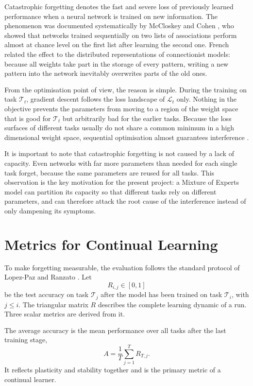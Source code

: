 Catastrophic forgetting denotes the fast and severe loss of previously
learned performance when a neural network is trained on new information.
The phenomenon was documented systematically by McCloskey and Cohen
\cite{mccloskey1989}, who showed that networks trained sequentially on two
lists of associations perform almost at chance level on the first list
after learning the second one. French \cite{french1999} related the effect
to the distributed representations of connectionist models: because all
weights take part in the storage of every pattern, writing a new pattern
into the network inevitably overwrites parts of the old ones.

From the optimisation point of view, the reason is simple. During the
training on task $\mathcal{T}_t$, gradient descent follows the loss
landscape of $\mathcal{L}_t$ only. Nothing in the objective prevents the
parameters from moving to a region of the weight space that is good for
$\mathcal{T}_t$ but arbitrarily bad for the earlier tasks. Because the loss
surfaces of different tasks usually do not share a common minimum in a high
dimensional weight space, sequential optimisation almost guarantees
interference \cite{goodfellow2013}.

It is important to note that catastrophic forgetting is not caused by a
lack of capacity. Even networks with far more parameters than needed for
each single task forget, because the same parameters are reused for all
tasks. This observation is the key motivation for the present project: a
Mixture of Experts model can partition its capacity so that different tasks
rely on different parameters, and can therefore attack the root cause of
the interference instead of only dampening its symptoms.

\section{Metrics for Continual Learning}
\label{sec:clmetrics}

To make forgetting measurable, the evaluation follows the standard protocol
of Lopez-Paz and Ranzato \cite{lopezpaz2017}. Let
\begin{equation}
  R_{i,j} \in [0,1]
\end{equation}
be the test accuracy on task $\mathcal{T}_j$ after the model has been
trained on task $\mathcal{T}_i$, with $j \leq i$. The triangular matrix $R$
describes the complete learning dynamic of a run. Three scalar metrics are
derived from it.

The average accuracy is the mean performance over all tasks after the last
training stage,
\begin{equation}
  A = \frac{1}{T} \sum_{j=1}^{T} R_{T,j}.
  \label{eq:avgacc}
\end{equation}
It reflects plasticity and stability together and is the primary metric of
a continual learner.

